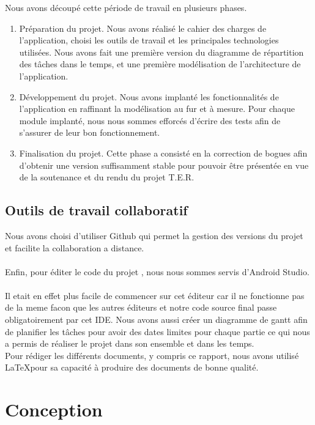 \documentclass{article}
\begin{document}
Nous avons découpé cette période de travail en plusieurs phases.
\begin{enumerate}
    \item Préparation du projet. Nous avons réalisé le cahier des charges de l’application, choisi les
          outils de travail et les principales technologies utilisées. Nous avons fait une première version
          du diagramme de répartition des tâches dans le temps, et une première modélisation de
          l’architecture de l’application.
\item Développement du projet. Nous avons implanté les fonctionnalités de l’application en
raffinant la modélisation au fur et à mesure. Pour chaque module implanté, nous nous sommes
efforcés d’écrire des tests afin de s’assurer de leur bon fonctionnement.
\item Finalisation du projet. Cette phase a consisté en la correction de bogues afin d’obtenir une
version suffisamment stable pour pouvoir être présentée en vue de la soutenance et du rendu
du projet T.E.R.
\end{enumerate}
\newpage

\subsection{Outils de travail collaboratif }
Nous avons choisi d’utiliser Github qui  permet la gestion des versions du projet et facilite la collaboration a distance.\\\\
Enfin, pour éditer le code du projet , nous nous sommes servis d'Android Studio.\\\\
Il etait en effet plus facile de commencer sur cet éditeur car il ne fonctionne pas de la meme facon que les autres éditeurs et notre code source final passe obligatoirement par cet IDE.
Nous avons aussi créer un diagramme de gantt afin de planifier les tâches pour avoir des dates limites pour chaque partie ce qui nous a permis de réaliser le projet dans son ensemble et dans les temps.\\
\newline Pour rédiger les différents documents, y compris ce rapport, nous
avons utilisé \LaTeX  pour sa capacité à produire des documents de bonne qualité.


\section{Conception}
\end{document}
